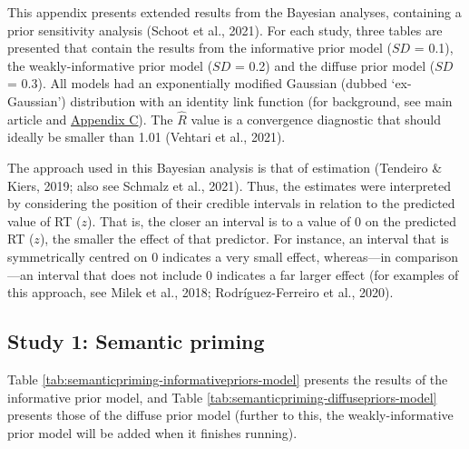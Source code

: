 \documentclass[
  12pt,
  man,floatsintext]{apa7}
\begin{document}
This appendix presents extended results from the Bayesian analyses, containing a prior sensitivity analysis (Schoot et al., 2021). For each study, three tables are presented that contain the results from the informative prior model (\(SD\) = 0.1), the weakly-informative prior model (\(SD\) = 0.2) and the diffuse prior model (\(SD\) = 0.3). All models had an exponentially modified Gaussian (dubbed `ex-Gaussian') distribution with an identity link function (for background, see main article and \protect\hyperlink{appendix-C-Bayesian-analysis-diagnostics}{\underline{Appendix C}}). The \(\widehat R\) value is a convergence diagnostic that should ideally be smaller than 1.01 (Vehtari et al., 2021).

The approach used in this Bayesian analysis is that of estimation (Tendeiro \& Kiers, 2019; also see Schmalz et al., 2021). Thus, the estimates were interpreted by considering the position of their credible intervals in relation to the predicted value of RT (\(z\)). That is, the closer an interval is to a value of 0 on the predicted RT (\(z\)), the smaller the effect of that predictor. For instance, an interval that is symmetrically centred on 0 indicates a very small effect, whereas---in comparison---an interval that does not include 0 indicates a far larger effect (for examples of this approach, see Milek et al., 2018; Rodríguez-Ferreiro et al., 2020).

\hypertarget{study-1-semantic-priming-4}{%
\subsection{Study 1: Semantic priming}\label{study-1-semantic-priming-4}}

Table \ref{tab:semanticpriming-informativepriors-model} presents the results of the informative prior model, and Table \ref{tab:semanticpriming-diffusepriors-model} presents those of the diffuse prior model (further to this, the weakly-informative prior model will be added when it finishes running).
\end{document}

